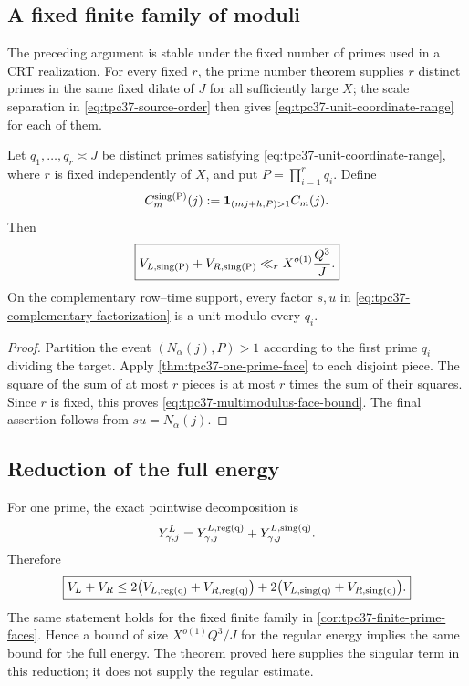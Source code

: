 \subsection{A fixed finite family of moduli}

The preceding argument is stable under the fixed number of primes used
in a CRT realization.
For every fixed \(r\), the prime number theorem supplies \(r\) distinct
primes in the same fixed dilate of \(J\) for all sufficiently large
\(X\); the scale separation in \eqref{eq:tpc37-source-order} then gives
\eqref{eq:tpc37-unit-coordinate-range} for each of them.

\begin{corollary}
\label{cor:tpc37-finite-prime-faces}
Let \(q_1,\ldots,q_r\asymp J\) be distinct primes satisfying
\eqref{eq:tpc37-unit-coordinate-range}, where \(r\) is fixed independently
of \(X\), and put \(P=\prod_{i=1}^{r}q_i\).  Define
\begin{equation}
 C_m^{\rm sing(P)}(j)
 :=\mathbf 1_{(mj+h,P)>1}C_m(j).
 \label{eq:tpc37-multimodulus-singular-increment}
\end{equation}
Then
\begin{equation}
 \boxed{
 V_{L,\rm sing(P)}+V_{R,\rm sing(P)}
 \ll_r X^{o(1)}\frac{Q^3}{J}.}
 \label{eq:tpc37-multimodulus-face-bound}
\end{equation}
On the complementary row--time support, every factor \(s,u\) in
\eqref{eq:tpc37-complementary-factorization} is a unit modulo every
\(q_i\).
\end{corollary}

\begin{proof}
Partition the event \((N_\alpha(j),P)>1\) according to the first prime
\(q_i\) dividing the target.  Apply
\cref{thm:tpc37-one-prime-face} to each disjoint piece.  The square of the
sum of at most \(r\) pieces is at most \(r\) times the sum of their
squares.  Since \(r\) is fixed, this proves
\eqref{eq:tpc37-multimodulus-face-bound}.  The final assertion follows
from \(su=N_\alpha(j)\).
\end{proof}

\subsection{Reduction of the full energy}

For one prime, the exact pointwise decomposition is
\begin{equation}
 Y_{\gamma,j}^L
 =Y_{\gamma,j}^{L,\rm reg(q)}
 +Y_{\gamma,j}^{L,\rm sing(q)}.
 \label{eq:tpc37-slice-regular-singular-split}
\end{equation}
Therefore
\begin{equation}
 \boxed{
 V_L+V_R
 \le2\bigl(V_{L,\rm reg(q)}+V_{R,\rm reg(q)}\bigr)
 +2\bigl(V_{L,\rm sing(q)}+V_{R,\rm sing(q)}\bigr).}
 \label{eq:tpc37-full-energy-reduction}
\end{equation}
The same statement holds for the fixed finite family in
\cref{cor:tpc37-finite-prime-faces}.  Hence a bound of size
\(X^{o(1)}Q^3/J\) for the regular energy implies the same bound for the
full energy.  The theorem proved here supplies the singular term in this
reduction; it does not supply the regular estimate.

